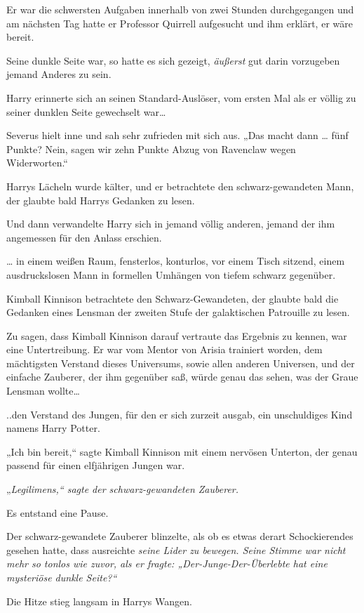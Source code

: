 {Er war die schwersten Aufgaben innerhalb von zwei Stunden durchgegangen und am nächsten Tag hatte er Professor Quirrell aufgesucht und ihm erklärt, er wäre bereit.

Seine dunkle Seite war, so hatte es sich gezeigt, \emph{äußerst} gut darin vorzugeben jemand Anderes zu sein.

Harry erinnerte sich an seinen Standard-Auslöser, vom ersten Mal als er völlig zu seiner dunklen Seite gewechselt war…

Severus hielt inne und sah sehr zufrieden mit sich aus. „Das macht dann … fünf Punkte? Nein, sagen wir zehn Punkte Abzug von Ravenclaw wegen Widerworten.“

Harrys Lächeln wurde kälter, und er betrachtete den schwarz-gewandeten Mann, der glaubte bald Harrys Gedanken zu lesen.

Und dann verwandelte Harry sich in jemand völlig anderen, jemand der ihm angemessen für den Anlass erschien.

… in einem weißen Raum, fensterlos, konturlos, vor einem Tisch sitzend, einem ausdruckslosen Mann in formellen Umhängen von tiefem schwarz gegenüber.

Kimball Kinnison betrachtete den Schwarz-Gewandeten, der glaubte bald die Gedanken eines Lensman der zweiten Stufe der galaktischen Patrouille zu lesen.

Zu sagen, dass Kimball Kinnison darauf vertraute das Ergebnis zu kennen, war eine Untertreibung. Er war vom Mentor von Arisia trainiert worden, dem mächtigsten Verstand dieses Universums, sowie allen anderen Universen, und der einfache Zauberer, der ihm gegenüber saß, würde genau das sehen, was der Graue Lensman wollte…

..den Verstand des Jungen, für den er sich zurzeit ausgab, ein unschuldiges Kind namens Harry Potter.

„Ich bin bereit,“ sagte Kimball Kinnison mit einem nervösen Unterton, der genau passend für einen elfjährigen Jungen war.

„\emph{Legilimens,“ sagte der schwarz-gewandeten Zauberer.}

Es entstand eine Pause.

Der schwarz-gewandete Zauberer blinzelte, als ob es etwas derart Schockierendes gesehen hatte, dass ausreichte \emph{seine Lider zu bewegen. Seine Stimme war nicht mehr so tonlos wie zuvor, als er fragte: „Der-Junge-Der-Überlebte hat \emph{eine mysteriöse dunkle Seite?“}}

Die Hitze stieg langsam in Harrys Wangen.

}
